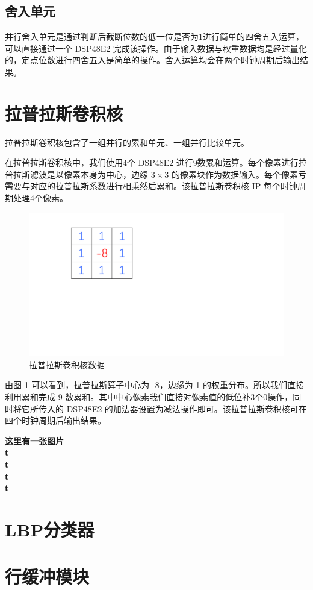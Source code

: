 \documentclass[12pt, a4paper, oneside]{ctexbook}
\begin{document}
	\subsection{舍入单元}
	并行舍入单元是通过判断后截断位数的低一位是否为1进行简单的四舍五入运算，可以直接通过一个 DSP48E2 完成该操作。由于输入数据与权重数据均是经过量化的，定点位数进行四舍五入是简单的操作。舍入运算均会在两个时钟周期后输出结果。
		
	\section{拉普拉斯卷积核}
	拉普拉斯卷积核包含了一组并行的累和单元、一组并行比较单元。\par
	在拉普拉斯卷积核中，我们使用4个 DSP48E2 进行9数累和运算。每个像素进行拉普拉斯滤波是以像素本身为中心，边缘 $3\times3$ 的像素块作为数据输入。每个像素亏需要与对应的拉普拉斯系数进行相乘然后累和。该拉普拉斯卷积核 IP 每个时钟周期处理4个像素。\par
	\begin{figure}[h]
		\centering
		\includegraphics[scale=0.5]{pic/number_3}
		\caption{拉普拉斯卷积核数据}
		\label{fig:number3}
	\end{figure}
	由图 \ref{fig:number3} 可以看到，拉普拉斯算子中心为 -8，边缘为 1 的权重分布。所以我们直接利用累和完成 9 数累和。其中中心像素我们直接对像素值的低位补3个0操作，同时将它所传入的 DSP48E2 的加法器设置为减法操作即可。该拉普拉斯卷积核可在四个时钟周期后输出结果。\par
	\textbf{这里有一张图片\\t\\t\\t\\t\\}
	
	\section{LBP分类器}
	\section{行缓冲模块}

	
	
\end{document}
